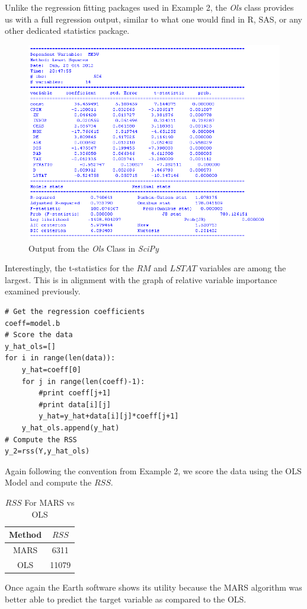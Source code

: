 Unlike the regression fitting packages used in Example 2, the \emph{Ols} class provides us with a full regression output, similar to what one would find in R, SAS, or any other dedicated statistics package.
\begin{figure}[H]
    \centering
       \includegraphics[width=6.5in]{ols_output.png}
    \caption{Output from the \emph{Ols} Class in \emph{SciPy}}
    \label{Example Data}
\end{figure}

Interestingly, the t-statistics for the $RM$ and $LSTAT$ variables are among the largest. This is in alignment with the graph of relative variable importance examined previously. 
\begin{lstlisting}[caption={Calculate the RSS for the OLS Model},label=2nd,firstnumber=83]
# Get the regression coefficients
coeff=model.b
# Score the data
y_hat_ols=[]
for i in range(len(data)):
    y_hat=coeff[0]
    for j in range(len(coeff)-1):
        #print coeff[j+1]
        #print data[i][j]
        y_hat=y_hat+data[i][j]*coeff[j+1]
    y_hat_ols.append(y_hat)
# Compute the RSS
y_2=rss(Y,y_hat_ols)

\end{lstlisting}
Again following the convention from Example 2, we score the data using the OLS Model and compute the $RSS$. 
\begin{table}[H]
\caption{$RSS$ For MARS vs OLS}
\centering
\begin{tabular}{c c}
\hline\hline
Method & $RSS$ \\
\hline
MARS &6311 \\
OLS & 11079 \\
\hline
\end{tabular}
\label{table:nonlin} 
\end{table}
Once again the Earth software shows its utility because the MARS algorithm was better able to predict the target variable as compared to the OLS.
